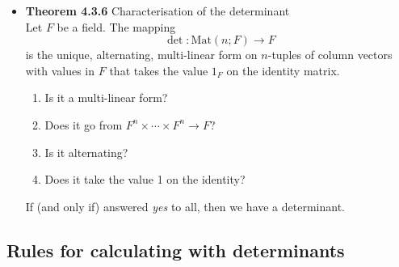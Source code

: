 \documentclass[11pt,a4paper]{article}
\begin{document}
\begin{itemize}
    \item \textbf{Theorem 4.3.6} Characterisation of the determinant \\
        Let $F$ be a field.
        The mapping
        \[
            \det : \mathrm{Mat}(n;F) \to F
        \]
        is the unique, alternating, multi-linear form on $n$-tuples of column vectors with values
        in $F$ that takes the value $1_F$ on the identity matrix.
        \begin{enumerate}
            \item Is it a multi-linear form?
            \item Does it go from $F^n \times \cdots \times F^n \to F$?
            \item Is it alternating?
            \item Does it take the value 1 on the identity?
        \end{enumerate}
        If (and only if) answered \emph{yes} to all, then we have a determinant.

\end{itemize}

\subsection{Rules for calculating with determinants}
\end{document}
